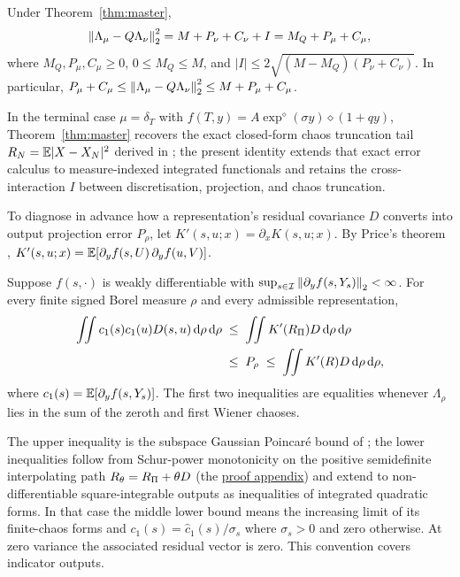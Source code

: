 \begin{corollary}\label{cor:ledgers}
Under Theorem~\ref{thm:master},
\[
  \left\lVert \Lambda_\mu-Q\Lambda_\nu\right\rVert_2^2=M+P_\nu+C_\nu+I=M_Q+P_\mu+C_\mu,
\]
where $M_Q,P_\mu,C_\mu\ge0$, $0\le M_Q\le M$, and
$|I|\le2\sqrt{(M-M_Q)(P_\nu+C_\nu)}$. In particular,
$P_\mu+C_\mu\le\left\lVert \Lambda_\mu-Q\Lambda_\nu\right\rVert_2^2\le M+P_\mu+C_\mu$.
\end{corollary}

In the terminal case $\mu=\delta_T$ with $f(T,y)=A\exp^\diamond(\sigma y)\diamond(1+qy)$,
Theorem~\ref{thm:master} recovers the exact closed-form chaos truncation tail $R_N=\mathbb{E}|X-X_N|^2$ derived
in \citet{AHMED2026111045}; the present identity extends that exact error calculus to measure-indexed
integrated functionals and retains the cross-interaction $I$ between discretisation, projection, and
chaos truncation.

To diagnose in advance how a representation's residual covariance $D$ converts into output projection error
$P_\rho$, let $K'(s,u;x)=\partial_x K(s,u;x)$. By Price's theorem \citep{Price1958,Voigtlaender2017Price},
$K'(s,u;x)=\mathbb{E}[\partial_y f(s,U)\,\partial_y f(u,V)]$.

\begin{theorem}\label{thm:sandwich}
Suppose $f(s,\cdot)$ is weakly differentiable with $\sup_{s\in\mathcal{I}}\left\lVert \partial_y f(s,Y_s)\right\rVert_2<\infty$.
For every finite signed Borel measure $\rho$ and every admissible representation,
\begin{equation}\label{eq:sandwich}
\begin{split}
  \iint c_1(s)c_1(u)D(s,u)\,\mathrm{d}\rho\,\mathrm{d}\rho
  &\;\le\;\iint K'(R_\Pi)D\,\mathrm{d}\rho\,\mathrm{d}\rho\\
  &\;\le\;P_\rho\;\le\;\iint K'(R)D\,\mathrm{d}\rho\,\mathrm{d}\rho,
\end{split}
\end{equation}
where $c_1(s)=\mathbb{E}[\partial_y f(s,Y_s)]$. The first two inequalities are equalities whenever $\Lambda_\rho$
lies in the sum of the zeroth and first Wiener chaoses.
\end{theorem}

The upper inequality is the subspace Gaussian Poincar\'e bound of \citet{ZahmConstantinePrieurMarzouk2020};
the lower inequalities follow from Schur-power monotonicity on the positive semidefinite interpolating path
$R_\theta=R_\Pi+\theta D$ (the \hyperref[app:proofs]{proof appendix}) and extend to non-differentiable square-integrable
outputs as inequalities of integrated quadratic forms. In that case the middle lower bound means
the increasing limit of its finite-chaos forms and $c_1(s)=\hat c_1(s)/\sigma_s$ where $\sigma_s>0$ and zero otherwise.
At zero variance the associated residual vector is zero. This convention covers indicator outputs.

